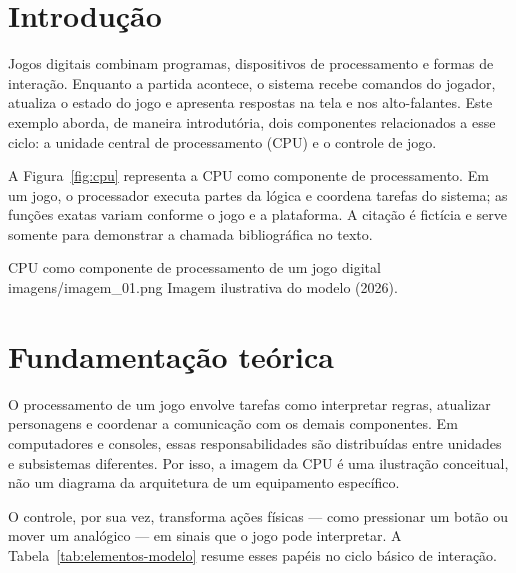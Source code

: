 
\aberturaartigo

\section{Introdução}
Jogos digitais combinam programas, dispositivos de processamento e formas de
interação. Enquanto a partida acontece, o sistema recebe comandos do jogador,
atualiza o estado do jogo e apresenta respostas na tela e nos alto-falantes.
Este exemplo aborda, de maneira introdutória, dois componentes relacionados a
esse ciclo: a unidade central de processamento (CPU) e o controle de jogo.

A Figura~\ref{fig:cpu} representa a CPU como componente de processamento. Em
um jogo, o processador executa partes da lógica e coordena tarefas do sistema;
as funções exatas variam conforme o jogo e a plataforma. A citação
\parencite{exemplo2026} é fictícia e serve somente para demonstrar a chamada
bibliográfica no texto.

  {CPU como componente de processamento de um jogo digital}
  {imagens/imagem_01.png}
  {Imagem ilustrativa do modelo (2026).}

\section{Fundamentação teórica}
O processamento de um jogo envolve tarefas como interpretar regras,
atualizar personagens e coordenar a comunicação com os demais componentes.
Em computadores e consoles, essas responsabilidades são distribuídas entre
unidades e subsistemas diferentes. Por isso, a imagem da CPU é uma ilustração
conceitual, não um diagrama da arquitetura de um equipamento específico.

O controle, por sua vez, transforma ações físicas — como pressionar um botão
ou mover um analógico — em sinais que o jogo pode interpretar. A Tabela~\ref{tab:elementos-modelo}
resume esses papéis no ciclo básico de interação.

